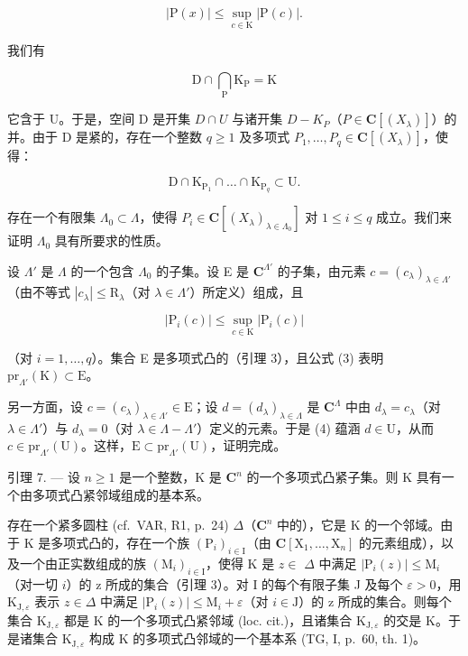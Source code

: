 \[
| \mathrm{P} (x) | \leqslant \sup _ {c \in \mathrm{K}} | \mathrm{P} (c) |.
\]

我们有

\[
\mathrm{D} \cap \bigcap_ {\mathrm{P}} \mathrm{K} _ {\mathrm{P}} = \mathrm{K}\tag{3}
\]

它含于 U。于是，空间 D 是开集 \(D \cap U\) 与诸开集 \(D - K_{P}\)（\(P \in \mathbf{C}[(X_{\lambda})]\)）的并。由于 D 是紧的，存在一个整数 \(q \geqslant 1\) 及多项式 \(P_{1}, \ldots, P_{q} \in \mathbf{C}[(X_{\lambda})]\)，使得：

\[
\mathrm{D} \cap \mathrm{K} _ {\mathrm{P} _ {1}} \cap \dots \cap \mathrm{K} _ {\mathrm{P} _ {q}} \subset \mathrm{U}.\tag{4}
\]

存在一个有限集 \(\Lambda_0 \subset \Lambda\)，使得 \(P_i \in \mathbf{C}[(X_\lambda)_{\lambda \in \Lambda_0}]\) 对 \(1 \leqslant i \leqslant q\) 成立。我们来证明 \(\Lambda_0\) 具有所要求的性质。

设 \(\Lambda'\) 是 \(\Lambda\) 的一个包含 \(\Lambda_0\) 的子集。设 E 是 \(\mathbf{C}^{\Lambda'}\) 的子集，由元素 \(c = (c_{\lambda})_{\lambda \in \Lambda'}\)（由不等式 \(|c_{\lambda}| \leqslant \mathrm{R}_{\lambda}\)（对 \(\lambda \in \Lambda'\)）所定义）组成，且

\[
| \mathrm{P} _ {i} (c) | \leqslant \sup _ {c \in \mathrm{K}} | \mathrm{P} _ {i} (c) |
\]

（对 \(i = 1, \ldots, q\)）。集合 E 是多项式凸的（引理 3），且公式 (3) 表明 \(\mathrm{pr}_{\Lambda'}(\mathrm{K}) \subset \mathrm{E}\)。

另一方面，设 \(c = (c_{\lambda})_{\lambda \in \Lambda'} \in \mathrm{E}\)；设 \(d = (d_{\lambda})_{\lambda \in \Lambda}\) 是 \(\mathbf{C}^{\Lambda}\) 中由 \(d_{\lambda} = c_{\lambda}\)（对 \(\lambda \in \Lambda'\)）与 \(d_{\lambda} = 0\)（对 \(\lambda \in \Lambda - \Lambda'\)）定义的元素。于是 (4) 蕴涵 \(d \in \mathrm{U}\)，从而 \(c \in \mathrm{pr}_{\Lambda'}(\mathrm{U})\)。这样，\(\mathrm{E} \subset \mathrm{pr}_{\Lambda'}(\mathrm{U})\)，证明完成。

引理 7. --- 设 \(n \geqslant 1\) 是一个整数，K 是 \(\mathbf{C}^{n}\) 的一个多项式凸紧子集。则 K 具有一个由多项式凸紧邻域组成的基本系。

存在一个紧多圆柱 (cf.~VAR, R1, p.~24) \(\Delta\)（\(\mathbf{C}^n\) 中的），它是 K 的一个邻域。由于 K 是多项式凸的，存在一个族 \((\mathrm{P}_i)_{i\in \mathrm{I}}\)（由 \(\mathbf{C}[\mathrm{X}_1,\dots ,\mathrm{X}_n]\) 的元素组成），以及一个由正实数组成的族 \((\mathrm{M}_i)_{i\in \mathrm{I}}\)，使得 K 是 \(z\in\) \(\Delta\) 中满足 \(|\mathrm{P}_i(z)|\leqslant \mathrm{M}_i\)（对一切 \(i\)）的 z 所成的集合（引理 3）。对 I 的每个有限子集 J 及每个 \(\varepsilon >0\)，用 \(\mathrm{K}_{\mathrm{J},\varepsilon}\) 表示 \(z\in \Delta\) 中满足 \(|\mathrm{P}_i(z)|\leqslant \mathrm{M}_i + \varepsilon\)（对 \(i\in \mathrm{J}\)）的 z 所成的集合。则每个集合 \(\mathrm{K}_{\mathrm{J},\varepsilon}\) 都是 K 的一个多项式凸紧邻域 (loc. cit.)，且诸集合 \(\mathrm{K}_{\mathrm{J},\varepsilon}\) 的交是 K。于是诸集合 \(\mathrm{K}_{\mathrm{J},\varepsilon}\) 构成 K 的多项式凸邻域的一个基本系 (TG, I, p.~60, th. 1)。

